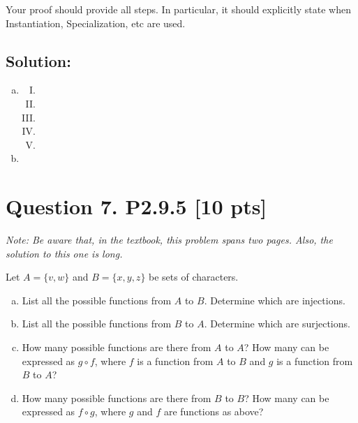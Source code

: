 \documentclass[12pt]{article}
\begin{document}
 Your proof should provide all steps.  In particular, it should explicitly state when Instantiation, Specialization, etc  are used.

\subsection*{\textbf{Solution:}}
\begin{enumerate}[(a)]
\item 
    \begin{enumerate}[I.]
    \item 
    \item 
    \item 
    \item 
    \item 
    \end{enumerate}
\item
\end{enumerate}
 \newpage



\newpage

\section*{\textbf{Question 7. P2.9.5} [10 pts]}
{\em \small Note: Be aware that, in the textbook, this problem spans two pages. Also, the solution to this one is long.}

 Let $A = \{v, w\}$ and $B = \{x, y, z\}$ be sets of characters.



\begin{enumerate}[(a)]
    \item  List all the possible functions from $A$ to $B$. Determine which are injections.

    \item  List all the possible functions from $B$ to $A$. Determine which are surjections. 


    \item  How many possible functions are there from $A$ to $A$? How many can be expressed as $g \circ f$, where $f$ is a function from $A$ to $B$ and $g$ is a function from $B$ to $A$?

    \item How many possible functions are there from $B$ to $B$? How many can be expressed as $f \circ g$, where $g$ and $f$ are functions as above?


\end{enumerate}
\end{document}
